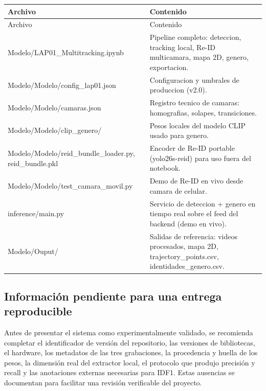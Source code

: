 \documentclass[12pt,letterpaper]{article}
\begin{document}
\begin{longtable}{P{0.34\textwidth}P{0.6\textwidth}}
\toprule

Archivo & Contenido \\

\midrule
\endfirsthead
\toprule
Archivo & Contenido \\
\midrule
\endhead

Modelo/\allowbreak LAP01\_\allowbreak Multitracking.ipynb & Pipeline completo: deteccion, tracking local, Re-ID multicamara, mapa 2D, genero, exportacion. \\

Modelo/\allowbreak Modelo/\allowbreak config\_\allowbreak lap01.json & Configuracion y umbrales de produccion (v2.0). \\

Modelo/\allowbreak Modelo/\allowbreak camaras.json & Registro tecnico de camaras: homografias, solapes, transiciones. \\

Modelo/\allowbreak Modelo/\allowbreak clip\_\allowbreak genero/ & Pesos locales del modelo CLIP usado para genero. \\

Modelo/\allowbreak Modelo/\allowbreak reid\_\allowbreak bundle\_\allowbreak loader.py, reid\_\allowbreak bundle.pkl & Encoder de Re-ID portable (yolo26s-reid) para uso fuera del notebook. \\

Modelo/\allowbreak Modelo/\allowbreak test\_\allowbreak camara\_\allowbreak movil.py & Demo de Re-ID en vivo desde camara de celular. \\

inference/main.py & Servicio de deteccion + genero en tiempo real sobre el feed del backend (demo en vivo). \\

Modelo/\allowbreak Ouput/ & Salidas de referencia: videos procesados, mapa 2D, trajectory\_\allowbreak points.csv, identidades\_\allowbreak genero.csv. \\

\bottomrule
\end{longtable}
\endgroup

\subsection{Información pendiente para una entrega reproducible}
Antes de presentar el sistema como experimentalmente validado, se recomienda completar el identificador de versión del repositorio, las versiones de bibliotecas, el hardware, los metadatos de las tres grabaciones, la procedencia y huella de los pesos, la dimensión real del extractor local, el protocolo que produjo precisión y recall y las anotaciones externas necesarias para IDF1. Estas ausencias se documentan para facilitar una revisión verificable del proyecto.
\end{document}
